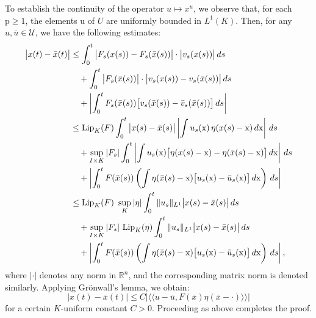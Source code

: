 \documentclass[sn-mathphys-num]{sn-jnl}
\numberwithin{equation}{section}
\theoremstyle{mythm}
\theoremstyle{mydef}
\newcommand{\Lip}{\mathrm{Lip}}
\renewcommand{\d}{\,d}
\newcommand{\R}{\mathbb{R}}
\begin{document}
To establish the continuity of the operator \( u \mapsto x^u \), we observe that, for each \( \mathrm{p} \geq 1 \), the elements \( \mathrm{u} \) of \( U \) are uniformly bounded in \( L^1(K) \). Then, for any \( u, \bar{u} \in \mathcal{U} \), we have the following estimates:
\begin{align*}
    \big|x(t) - \bar{x}(t)\big| &\leq \int_{0}^t \big|F_s(x(s)) - F_s(\bar{x}(s))\big|\cdot \big|v_s(x(s))\big| \d{s} \\
    &\quad + \int_{0}^t \big|F_s(\bar{x}(s))\big|\cdot \big|v_s(x(s)) - v_s(\bar{x}(s))\big| \d{s} \\
    &\quad + \left|\int_{0}^t F_s(\bar{x}(s)) \big[v_s(\bar{x}(s)) - \bar{v}_s(\bar{x}(s))\big] \d{s}\right| \\
    &\leq \Lip_{K}(F) \int_{0}^t \big|x(s) - \bar{x}(s)\big| \left|\int u_s({\rm x}) \, \eta(x(s)-{\rm x}) \d{\rm x}\right| \d{s} \\
    &\quad + \sup_{I \times K}|F_s| \int_{0}^t \left|\int  u_s({\rm x}) \big[\eta(x(s) - \mathrm x)- \eta(\bar x(s) - {\rm x})\big]\d\mathrm{x}\right| \d{s} \\
    &\quad + \left|\int_{0}^t F(\bar{x}(s)) \left(\int \eta(\bar{x}(s) - {\rm x})\big[u_s({\rm x}) - \bar{u}_s({\rm x})\big] \d {\rm x}\right)\d{s}\right|\\
    &\leq \Lip_{K}(F) \ \sup_{K}|\eta| \int_{0}^t \|{u}_s\|_{L^1} \big|x(s) - \bar{x}(s)\big| \d{s} \\
    &\quad + \sup_{I \times K}|F_s| \ \Lip_{K}(\eta) \int_{0}^t \|u_s\|_{L^1} \big|x(s) - \bar{x}(s)\big| \d{s} \\
    &\quad + \left|\int_{0}^t F(\bar{x}(s)) \left(\int \eta(\bar{x}(s) - {\rm x})\big[u_s({\rm x}) - \bar{u}_s({\rm x})\big] \d {\rm x}\right)\d{s}\right|,
\end{align*}
where \( |\cdot| \) denotes any norm in \( \R^n \), and the corresponding matrix norm is denoted similarly. Applying Gr\"onwall's lemma, we obtain:
\[
    \big|x(t) - \bar{x}(t)\big| \leq C \big|\langle\!\langle u - \bar{u}, F(\bar{x}) \eta(\bar{x} - \cdot)\rangle\!\rangle\big|
\]
for a certain \( K \)-uniform constant \( C > 0 \). Proceeding as above completes the proof.


\small{

	

}
\end{document}
